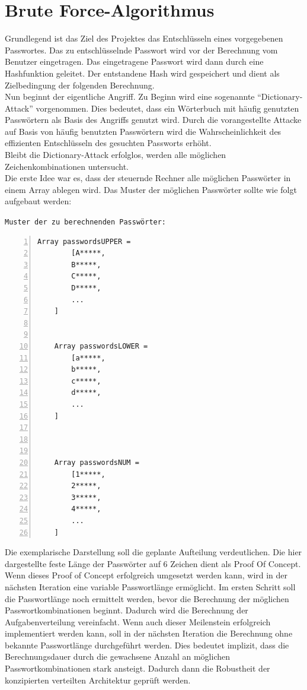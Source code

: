 \section{Brute Force-Algorithmus}
\label{ideeBruteForce}
Grundlegend ist das Ziel des Projektes das Entschlüsseln eines vorgegebenen Passwortes. Das zu entschlüsselnde Passwort wird vor der Berechnung vom Benutzer eingetragen. Das eingetragene Passwort wird dann durch eine Hashfunktion geleitet. Der entstandene Hash wird gespeichert und dient als Zielbedingung der folgenden Berechnung. \\
Nun beginnt der eigentliche Angriff. Zu Beginn wird eine sogenannte \enquote{Dictionary-Attack} vorgenommen. Dies bedeutet, dass ein Wörterbuch mit häufig genutzten Passwörtern als Basis des Angriffs genutzt wird. Durch die vorangestellte Attacke auf Basis von häufig benutzten Passwörtern wird die Wahrscheinlichkeit des effizienten Entschlüsseln des gesuchten Passworts erhöht. \\
Bleibt die Dictionary-Attack erfolglos, werden alle möglichen Zeichenkombinationen untersucht. \\
Die erste Idee war es, dass der steuernde Rechner alle möglichen Passwörter in einem Array ablegen wird. Das Muster der möglichen Passwörter sollte wie folgt aufgebaut werden: 

\texttt{Muster der zu berechnenden Passwörter:}
\begin{lstlisting}[basicstyle=\ttfamily,numbers=left,numberstyle=\footnotesize\ttfamily,backgroundcolor=\color{sourcegray}]
	Array passwordsUPPER = 
		[A*****,
	 	B*****,
	 	C*****,
	 	D*****,
	 	...
	]
	
	
	Array passwordsLOWER = 
		[a*****,
	 	b*****,
	 	c*****,
	 	d*****,
		...
	]
	
	

	Array passwordsNUM = 
		[1*****,
	 	2*****,
	 	3*****,
	 	4*****,
		...
	]
\end{lstlisting}

Die exemplarische Darstellung soll die geplante Aufteilung verdeutlichen. Die hier dargestellte feste Länge der Passwörter auf 6 Zeichen dient als Proof Of Concept. Wenn dieses Proof of Concept erfolgreich umgesetzt werden kann, wird in der nächsten Iteration eine variable Passwortlänge ermöglicht. Im ersten Schritt soll die Passwortlänge noch ermittelt werden, bevor die Berechnung der möglichen Passwortkombinationen beginnt. Dadurch wird die Berechnung der Aufgabenverteilung vereinfacht. Wenn auch dieser Meilenstein erfolgreich implementiert werden kann, soll in der nächsten Iteration die Berechnung ohne bekannte Passwortlänge durchgeführt werden. Dies bedeutet implizit, dass die Berechnungsdauer durch die gewachsene Anzahl an möglichen Passwortkombinationen stark ansteigt. Dadurch dann die Robustheit der konzipierten verteilten Architektur geprüft werden. \\

